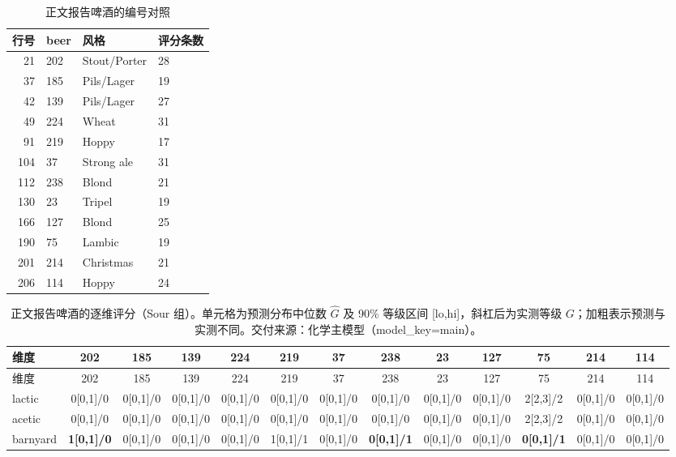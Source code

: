 \begin{landscape}
\scriptsize
\begin{table}[h]
\centering
\caption{正文报告啤酒的编号对照}\label{tab:q1_report_beers_map_sour}
\begin{tabular}{rlll}
\toprule
行号 & beer & 风格 & 评分条数 \\
\midrule
21 & 202 & Stout/Porter & 28 \\
37 & 185 & Pils/Lager & 19 \\
42 & 139 & Pils/Lager & 27 \\
49 & 224 & Wheat & 31 \\
91 & 219 & Hoppy & 17 \\
104 & 37 & Strong ale & 31 \\
112 & 238 & Blond & 21 \\
130 & 23 & Tripel & 19 \\
166 & 127 & Blond & 25 \\
190 & 75 & Lambic & 19 \\
201 & 214 & Christmas & 21 \\
206 & 114 & Hoppy & 24 \\
\bottomrule
\end{tabular}
\end{table}
\begin{longtable}{lcccccccccccc}
\caption{正文报告啤酒的逐维评分（Sour 组）。单元格为预测分布中位数 $\hat G$ 及 90\% 等级区间 [lo,hi]，斜杠后为实测等级 $G$；加粗表示预测与实测不同。交付来源：化学主模型（model\_key=main）。}\label{tab:q1_report_beers_sour}\\
\toprule
维度 & 202 & 185 & 139 & 224 & 219 & 37 & 238 & 23 & 127 & 75 & 214 & 114 \\
\midrule
\endfirsthead
\toprule
维度 & 202 & 185 & 139 & 224 & 219 & 37 & 238 & 23 & 127 & 75 & 214 & 114 \\
\midrule
\endhead
\bottomrule
\endfoot
lactic & 0[0,1]/0 & 0[0,1]/0 & 0[0,1]/0 & 0[0,1]/0 & 0[0,1]/0 & 0[0,1]/0 & 0[0,1]/0 & 0[0,1]/0 & 0[0,1]/0 & 2[2,3]/2 & 0[0,1]/0 & 0[0,1]/0 \\
acetic & 0[0,1]/0 & 0[0,1]/0 & 0[0,1]/0 & 0[0,1]/0 & 0[0,1]/0 & 0[0,1]/0 & 0[0,1]/0 & 0[0,1]/0 & 0[0,1]/0 & 2[2,3]/2 & 0[0,1]/0 & 0[0,1]/0 \\
barnyard & \textbf{1[0,1]/0} & 0[0,1]/0 & 0[0,1]/0 & 0[0,1]/0 & 1[0,1]/1 & 0[0,1]/0 & \textbf{0[0,1]/1} & 0[0,1]/0 & 0[0,1]/0 & \textbf{0[0,1]/1} & 0[0,1]/0 & 0[0,1]/0 \\
\end{longtable}
\end{landscape}

